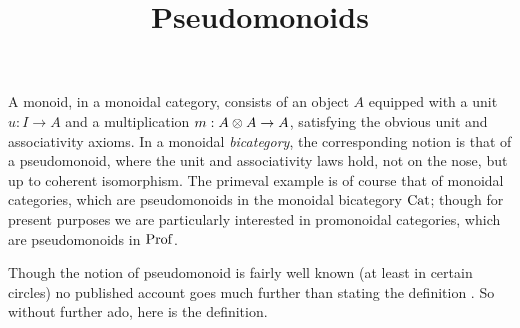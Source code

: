 \documentclass{robinthesisdraft}
\title{Pseudomonoids}
\begin{document}
\maketitle

A monoid, in a monoidal category, consists of an object $A$ equipped
with a unit $u: I\to A$ and a multiplication $m: A\tn A\to A$, satisfying
the obvious unit and associativity axioms. In a monoidal \emph{bicategory},
the corresponding notion is that of a pseudomonoid, where the unit and
associativity laws hold, not on the nose, but up to coherent isomorphism.
The primeval example is of course that of monoidal categories, which are
pseudomonoids in the monoidal bicategory $\mathrm{Cat}$; though for present
purposes we are particularly interested in promonoidal categories,
which are pseudomonoids in $\mathrm{Prof}$.

Though the notion of pseudomonoid is fairly well known (at least in
certain circles) no published account goes
much further than stating the definition \citep{MonBicat}.
So without further ado, here is the definition.
\end{document}
